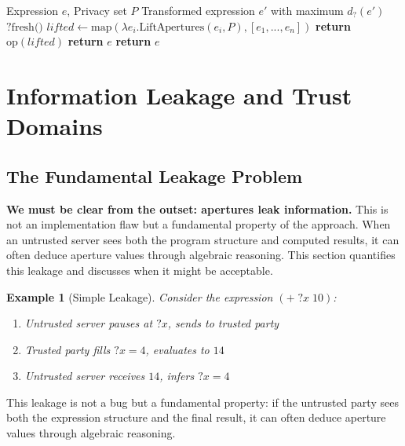 \documentclass[12pt]{article}
\newtheorem{example}[theorem]{Example}
\begin{document}
\begin{algorithm}
\caption{Aperture Lifting Transformation}
\begin{algorithmic}[1]
\Require Expression $e$, Privacy set $P$
\Ensure Transformed expression $e'$ with maximum $d_?(e')$
        \State \Return $?\text{fresh()}$
        \State $lifted \gets \text{map}(\lambda e_i. \text{LiftApertures}(e_i, P), [e_1, ..., e_n])$
            \State \textbf{return} $\text{op}(lifted)$
        \Else
            \State \textbf{return} $e$ 
        \EndIf
    \Else
        \State \textbf{return} $e$
    \EndIf
\EndProcedure
\end{algorithmic}
\end{algorithm}

\section{Information Leakage and Trust Domains}

\subsection{The Fundamental Leakage Problem}

\textbf{We must be clear from the outset: apertures leak information.} This is not an implementation flaw but a fundamental property of the approach. When an untrusted server sees both the program structure and computed results, it can often deduce aperture values through algebraic reasoning. This section quantifies this leakage and discusses when it might be acceptable.

\begin{example}[Simple Leakage]
Consider the expression $(+ \; ?x \; 10)$:
\begin{enumerate}
    \item Untrusted server pauses at $?x$, sends to trusted party
    \item Trusted party fills $?x = 4$, evaluates to $14$
    \item Untrusted server receives $14$, infers $?x = 4$
\end{enumerate}
\end{example}

This leakage is not a bug but a fundamental property: if the untrusted party sees both the expression structure and the final result, it can often deduce aperture values through algebraic reasoning.
\end{document}
